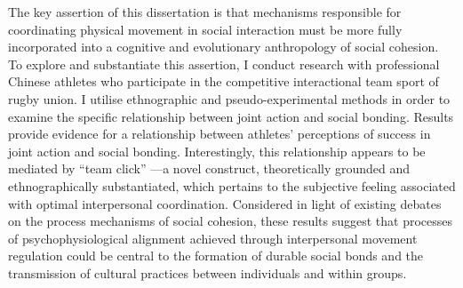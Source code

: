 The key assertion of this dissertation is that mechanisms responsible for coordinating physical movement in social interaction must be more fully incorporated into a cognitive and evolutionary anthropology of social cohesion. To explore and substantiate this assertion, I conduct research with professional Chinese athletes who participate in the competitive interactional team sport of rugby union.  I utilise ethnographic and pseudo-experimental methods in order to examine the specific relationship between joint action and social bonding.  Results provide evidence for a relationship between athletes' perceptions of success in joint action and social bonding.  Interestingly, this relationship appears to be mediated by ``team click'' ---a novel construct, theoretically grounded and ethnographically substantiated, which pertains to the subjective feeling associated with optimal interpersonal coordination.  Considered in light of existing debates on the process mechanisms of social cohesion, these results suggest that processes of psychophysiological alignment achieved through interpersonal movement regulation could be central to the formation of durable social bonds and the transmission of cultural practices between individuals and within groups.
